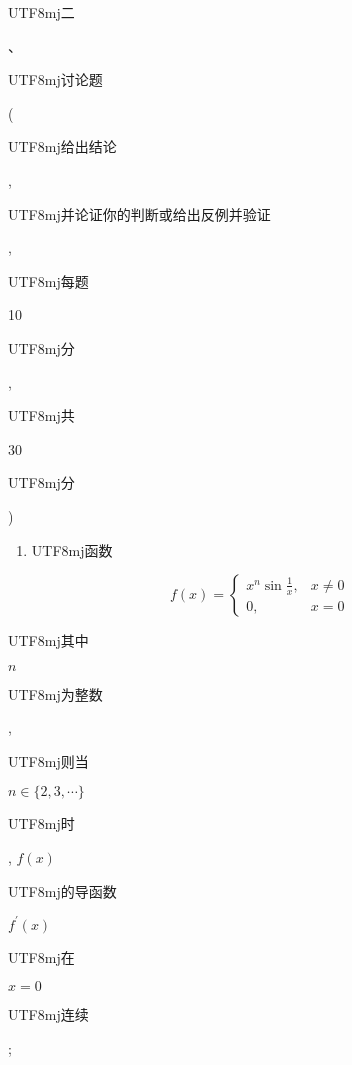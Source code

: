 \documentclass[10pt]{article}
\begin{document}
\begin{CJK}{UTF8}{mj}二\end{CJK}、\begin{CJK}{UTF8}{mj}讨论题\end{CJK} (\begin{CJK}{UTF8}{mj}给出结论\end{CJK}, \begin{CJK}{UTF8}{mj}并论证你的判断或给出反例并验证\end{CJK}, \begin{CJK}{UTF8}{mj}每题\end{CJK} 10 \begin{CJK}{UTF8}{mj}分\end{CJK}, \begin{CJK}{UTF8}{mj}共\end{CJK} 30 \begin{CJK}{UTF8}{mj}分\end{CJK})

\begin{enumerate}
  \item \begin{CJK}{UTF8}{mj}函数\end{CJK}
\end{enumerate}
$$
f(x)= \begin{cases}x^{n} \sin \frac{1}{x}, & x \neq 0 \\ 0, & x=0\end{cases}
$$
\begin{CJK}{UTF8}{mj}其中\end{CJK} $n$ \begin{CJK}{UTF8}{mj}为整数\end{CJK}, \begin{CJK}{UTF8}{mj}则当\end{CJK} $n \in\{2,3, \cdots\}$ \begin{CJK}{UTF8}{mj}时\end{CJK}, $f(x)$ \begin{CJK}{UTF8}{mj}的导函数\end{CJK} $f^{\prime}(x)$ \begin{CJK}{UTF8}{mj}在\end{CJK} $x=0$ \begin{CJK}{UTF8}{mj}连续\end{CJK};
\end{document}

